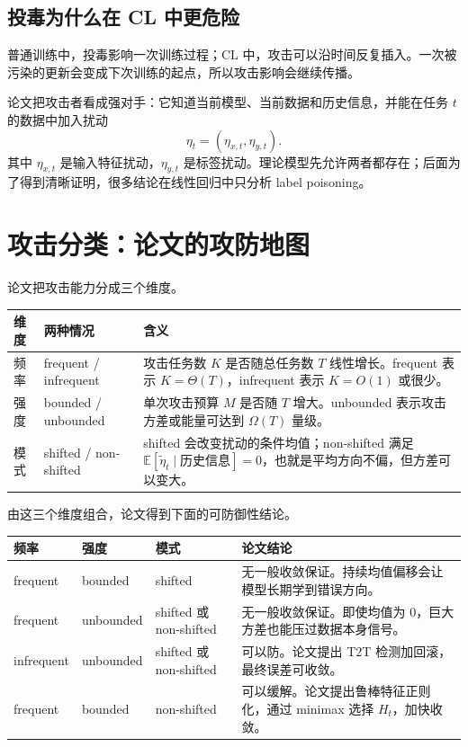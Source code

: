 \documentclass[UTF8,fontset=none,11pt]{ctexart}
\newcommand{\E}{\mathbb{E}}
\begin{document}
\subsection{投毒为什么在 CL 中更危险}

普通训练中，投毒影响一次训练过程；CL 中，攻击可以沿时间反复插入。一次被污染的更新会变成下次训练的起点，所以攻击影响会继续传播。

论文把攻击者看成强对手：它知道当前模型、当前数据和历史信息，并能在任务 \(t\) 的数据中加入扰动
\[
  \eta_t=(\eta_{x,t},\eta_{y,t}).
\]
其中 \(\eta_{x,t}\) 是输入特征扰动，\(\eta_{y,t}\) 是标签扰动。理论模型先允许两者都存在；后面为了得到清晰证明，很多结论在线性回归中只分析 label poisoning。

\section{攻击分类：论文的攻防地图}

论文把攻击能力分成三个维度。

\begin{center}
\begin{tabular}{p{3.0cm}p{5.0cm}p{6.2cm}}
\toprule
维度 & 两种情况 & 含义 \\
\midrule
频率 & frequent / infrequent
& 攻击任务数 \(K\) 是否随总任务数 \(T\) 线性增长。frequent 表示 \(K=\Theta(T)\)，infrequent 表示 \(K=O(1)\) 或很少。\\
\addlinespace
强度 & bounded / unbounded
& 单次攻击预算 \(M\) 是否随 \(T\) 增大。unbounded 表示攻击方差或能量可达到 \(\Omega(T)\) 量级。\\
\addlinespace
模式 & shifted / non-shifted
& shifted 会改变扰动的条件均值；non-shifted 满足 \(\E[\tilde\eta_t\mid\text{历史信息}]=0\)，也就是平均方向不偏，但方差可以变大。\\
\bottomrule
\end{tabular}
\end{center}

由这三个维度组合，论文得到下面的可防御性结论。

\begin{center}
\begin{tabular}{p{2.8cm}p{2.8cm}p{3.2cm}p{5.2cm}}
\toprule
频率 & 强度 & 模式 & 论文结论 \\
\midrule
frequent & bounded & shifted
& 无一般收敛保证。持续均值偏移会让模型长期学到错误方向。\\
\addlinespace
frequent & unbounded & shifted 或 non-shifted
& 无一般收敛保证。即使均值为 0，巨大方差也能压过数据本身信号。\\
\addlinespace
infrequent & unbounded & shifted 或 non-shifted
& 可以防。论文提出 T2T 检测加回滚，最终误差可收敛。\\
\addlinespace
frequent & bounded & non-shifted
& 可以缓解。论文提出鲁棒特征正则化，通过 minimax 选择 \(H_t\)，加快收敛。\\
\bottomrule
\end{tabular}
\end{center}
\end{document}
